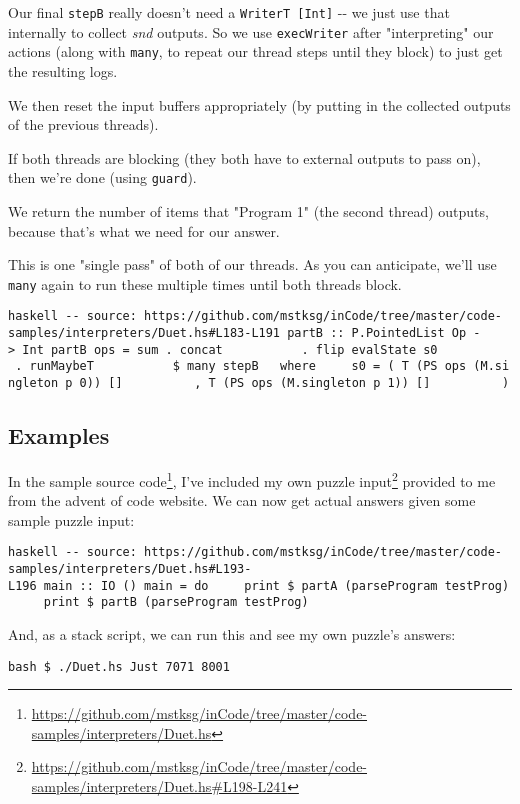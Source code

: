 \documentclass[]{article}
\renewcommand{\href}[2]{#2\footnote{\url{#1}}}
\begin{document}
Our final \texttt{stepB} really doesn't need a \texttt{WriterT\ {[}Int{]}} -\/-
we just use that internally to collect \emph{snd} outputs. So we use
\texttt{execWriter} after "interpreting" our actions (along with \texttt{many},
to repeat our thread steps until they block) to just get the resulting logs.

We then reset the input buffers appropriately (by putting in the collected
outputs of the previous threads).

If both threads are blocking (they both have to external outputs to pass on),
then we're done (using \texttt{guard}).

We return the number of items that "Program 1" (the second thread) outputs,
because that's what we need for our answer.

This is one "single pass" of both of our threads. As you can anticipate, we'll
use \texttt{many} again to run these multiple times until both threads block.

\texttt{haskell\ -\/-\ source:\ https://github.com/mstksg/inCode/tree/master/code-samples/interpreters/Duet.hs\#L183-L191\ partB\ ::\ P.PointedList\ Op\ -\textgreater{}\ Int\ partB\ ops\ =\ sum\ .\ concat\ \ \ \ \ \ \ \ \ \ \ .\ flip\ evalState\ s0\ \ \ \ \ \ \ \ \ \ \ .\ runMaybeT\ \ \ \ \ \ \ \ \ \ \ \$\ many\ stepB\ \ \ where\ \ \ \ \ s0\ =\ (\ T\ (PS\ ops\ (M.singleton\ \textquotesingle{}p\textquotesingle{}\ 0))\ {[}{]}\ \ \ \ \ \ \ \ \ \ ,\ T\ (PS\ ops\ (M.singleton\ \textquotesingle{}p\textquotesingle{}\ 1))\ {[}{]}\ \ \ \ \ \ \ \ \ \ )}

\subsection{Examples}

In the
\href{https://github.com/mstksg/inCode/tree/master/code-samples/interpreters/Duet.hs}{sample
source code}, I've included
\href{https://github.com/mstksg/inCode/tree/master/code-samples/interpreters/Duet.hs\#L198-L241}{my
own puzzle input} provided to me from the advent of code website. We can now get
actual answers given some sample puzzle input:

\texttt{haskell\ -\/-\ source:\ https://github.com/mstksg/inCode/tree/master/code-samples/interpreters/Duet.hs\#L193-L196\ main\ ::\ IO\ ()\ main\ =\ do\ \ \ \ \ print\ \$\ partA\ (parseProgram\ testProg)\ \ \ \ \ print\ \$\ partB\ (parseProgram\ testProg)}

And, as a stack script, we can run this and see my own puzzle's answers:

\texttt{bash\ \$\ ./Duet.hs\ Just\ 7071\ 8001}
\end{document}

